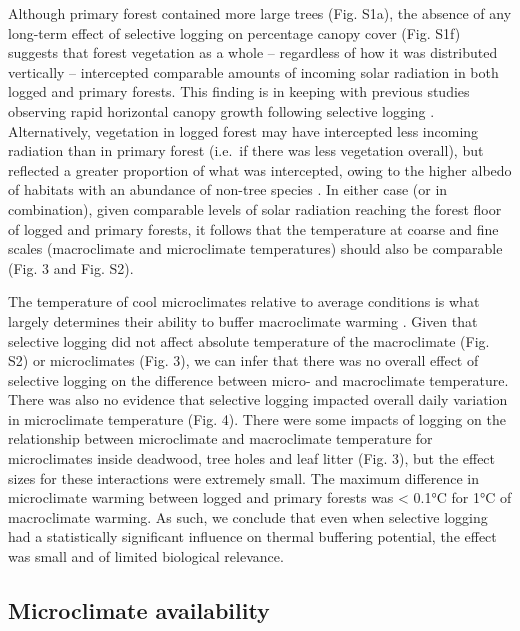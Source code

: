 \documentclass[12pt,a4paper,]{report}
\theoremstyle{definition}
\theoremstyle{definition}
\theoremstyle{definition}
\theoremstyle{remark}
\begin{document}
Although primary forest contained more large trees (Fig. S1a), the
absence of any long-term effect of selective logging on percentage
canopy cover (Fig. S1f) suggests that forest vegetation as a whole --
regardless of how it was distributed vertically -- intercepted
comparable amounts of incoming solar radiation in both logged and
primary forests. This finding is in keeping with previous studies
observing rapid horizontal canopy growth following selective logging
\citep[e.g.][]{asner_canopy2004}. Alternatively, vegetation in logged
forest may have intercepted less incoming radiation than in primary
forest (i.e.~if there was less vegetation overall), but reflected a
greater proportion of what was intercepted, owing to the higher albedo
of habitats with an abundance of non-tree species
\citep{oke_boundary1987, davin_climatic2010, edwards_maintaining2014}.
In either case (or in combination), given comparable levels of solar
radiation reaching the forest floor of logged and primary forests, it
follows that the temperature at coarse and fine scales (macroclimate and
microclimate temperatures) should also be comparable (Fig. 3 and Fig.
S2).

The temperature of cool microclimates relative to average conditions is
what largely determines their ability to buffer macroclimate warming
\citep{scheffers_microhabitats2014-1, gonzalez_del_pliego_thermally2016, shi_framework2016}.
Given that selective logging did not affect absolute temperature of the
macroclimate (Fig. S2) or microclimates (Fig. 3), we can infer that
there was no overall effect of selective logging on the difference
between micro- and macroclimate temperature. There was also no evidence
that selective logging impacted overall daily variation in microclimate
temperature (Fig. 4). There were some impacts of logging on the
relationship between microclimate and macroclimate temperature for
microclimates inside deadwood, tree holes and leaf litter (Fig. 3), but
the effect sizes for these interactions were extremely small. The
maximum difference in microclimate warming between logged and primary
forests was \textless{} 0.1°C for 1°C of macroclimate warming. As such,
we conclude that even when selective logging had a statistically
significant influence on thermal buffering potential, the effect was
small and of limited biological relevance.

\subsection{Microclimate
availability}\label{microclimate-availability-1}
\end{document}
